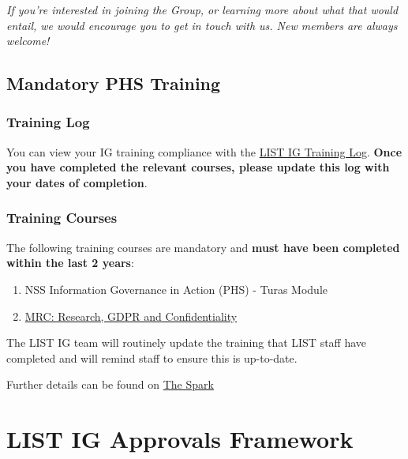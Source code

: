 \documentclass[
]{book}
\begin{document}
\emph{If you're interested in joining the Group, or learning more about what that would entail, we would encourage you to get in touch with us. New members are always welcome!}

\hypertarget{training}{%
\section{Mandatory PHS Training}\label{training}}

\hypertarget{training-log}{%
\subsection{Training Log}\label{training-log}}

You can view your IG training compliance with the \href{https://scottish.sharepoint.com/:x:/r/sites/PHS-LIST/_layouts/15/Doc.aspx?sourcedoc=\%7BF39C55E2-B0CB-45AC-86DD-2554D4816407\%7D\&file=LIST\%20IG\%20Training.xlsx\&action=default\&mobileredirect=true}{LIST IG Training Log}. \textbf{Once you have completed the relevant courses, please update this log with your dates of completion}.

\hypertarget{training-courses}{%
\subsection{Training Courses}\label{training-courses}}

The following training courses are mandatory and \textbf{must have been completed within the last 2 years}:

\begin{enumerate}
\def\labelenumi{\arabic{enumi}.}
\item
  NSS Information Governance in Action (PHS) - Turas Module
\item
  \href{https://byglearning.co.uk/mrcrsc-lms/course/index.php?categoryid=1}{MRC: Research, GDPR and Confidentiality}
\end{enumerate}

The LIST IG team will routinely update the training that LIST staff have completed and will remind staff to ensure this is up-to-date.

Further details can be found on \href{http://spark.publichealthscotland.org/corporate-guidance/information-governance/data-protection/training-and-guidance/}{The Spark}

\hypertarget{list-ig-approvals-framework}{%
\chapter{LIST IG Approvals Framework}\label{list-ig-approvals-framework}}
\end{document}
